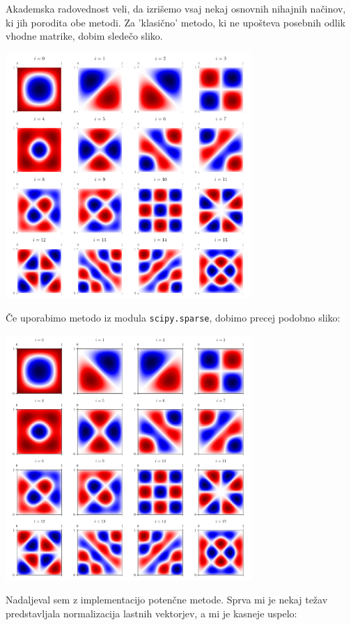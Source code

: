 Akademska radovednost veli, da izrišemo vsaj nekaj osnovnih nihajnih načinov,  ki jih porodita obe metodi. Za 'klasično' metodo, ki ne upošteva posebnih odlik vhodne matrike, dobim sledečo sliko.
\begin{center}
    \includegraphics[width=0.7\textwidth]{../old/1-0-nihajni_nacini.pdf}
\end{center}
Če uporabimo metodo iz modula \texttt{scipy.sparse}, dobimo precej podobno sliko:
\begin{center}
    \includegraphics[width=0.7\textwidth]{../old/1-0-nihajni_nacini_sparse.pdf}
\end{center}
Nadaljeval sem z implementacijo potenčne metode. Sprva mi je nekaj težav predstavljala normalizacija lastnih vektorjev, a mi je kasneje uspelo:

